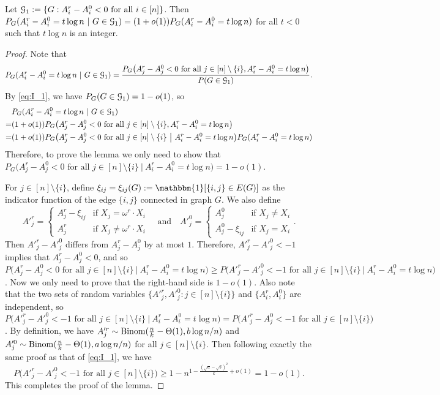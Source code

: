 \documentclass{article}
\begin{document}
\begin{lemma}  \label{lm:5t}
Let $\mathcal{G}_1:=\{G:A^r_i-A^0_i<0\text{~for all~}i\in[n]\}$.
Then $P_G(A^r_i-A^0_i= t\log n~|~G\in\mathcal{G}_1)= (1+o(1))P_G(A^r_i-A^0_i= t\log n)$ for all $t<0$ such that $t\log n$ is an integer.
\end{lemma}

\begin{proof}
Note that 
$$
P_G(A^r_i-A^0_i= t\log n~|~G\in\mathcal{G}_1)
=\frac{P_G \big(A^r_j-A^0_j<0\text{~for all~} j\in[n]\setminus\{i\}, A^r_i-A^0_i= t\log n \big)}{P(G\in\mathcal{G}_1)} .
$$
By \eqref{eq:I_1}, we have $P_G(G\in\mathcal{G}_1)=1-o(1)$, so
\begin{align*}
& P_G(A^r_i-A^0_i= t\log n~|~G\in\mathcal{G}_1) \\
= & (1+o(1)) P_G \big(A^r_j-A^0_j<0\text{~for all~} j\in[n]\setminus\{i\}, A^r_i-A^0_i= t\log n \big) \\
= & (1+o(1)) P_G \big(A^r_j-A^0_j<0\text{~for all~} j\in[n]\setminus\{i\} ~\big|~ A^r_i-A^0_i= t\log n \big) P_G(A^r_i-A^0_i= t\log n)
\end{align*}
Therefore, to prove the lemma we only need to show that $P_G \big(A^r_j-A^0_j<0\text{~for all~} j\in[n]\setminus\{i\} ~\big|~ A^r_i-A^0_i= t\log n \big)=1-o(1)$. 

For $j\in[n]\setminus\{i\}$, define $\xi_{ij}=\xi_{ij}(G):=\mathbbm{1}[\{i,j\}\in E(G)]$ as the indicator function of the edge $\{i,j\}$ connected in graph $G$. We also define 
$$
A'^r_j=\left\{
\begin{array}{cl}
  A^r_j-\xi_{ij}   & \mbox{if~} X_j = \omega^r \cdot X_i \\
  A^r_j   &   \mbox{if~} X_j \neq \omega^r \cdot X_i
\end{array}
\right.
\quad \text{and} \quad
A'^0_j=\left\{
\begin{array}{cl}
  A^0_j   & \mbox{if~} X_j \neq X_i \\
  A^0_j-\xi_{ij}   &   \mbox{if~} X_j = X_i
\end{array}
\right. .
$$
Then $A'^r_j-A'^0_j$ differs from $A^r_j-A^0_j$ by at most $1$.
Therefore, $A'^r_j-A'^0_j<-1$ implies that $A^r_j-A^0_j<0$,
and so $P \big(A^r_j-A^0_j<0\text{~for all~} j\in[n]\setminus\{i\} ~\big|~ A^r_i-A^0_i= t\log n \big) \ge P \big(A'^r_j-A'^0_j<-1 \text{~for all~} j\in[n]\setminus\{i\} ~\big|~ A^r_i-A^0_i= t\log n \big)$.
Now we only need to prove that the right-hand side is $1-o(1)$.
Also note that the two sets of random variables $\{A'^r_j,A'^0_j:j\in[n]\setminus\{i\}\}$ and $\{A^r_i,A^0_i\}$ are independent,
so $P \big(A'^r_j-A'^0_j<-1 \text{~for all~} j\in[n]\setminus\{i\} ~\big|~ A^r_i-A^0_i= t\log n \big)=P \big(A'^r_j-A^0_j<-1 \text{~for all~} j\in[n]\setminus\{i\}  \big)$.
By definition, we have
$A'^r_j\sim\operatorname{Binom}(\frac{n}{k}-\Theta(1),b\log n/n)$
and $A'^0_j\sim\operatorname{Binom}(\frac{n}{k}-\Theta(1),a\log n/n)$ for all $j\in[n]\setminus\{i\}$.
Then following exactly the same proof as that of \eqref{eq:I_1}, we have
$$
P \big(A'^r_j-A'^0_j <-1 \text{~for all~} j\in[n]\setminus\{i\}  \big)
\ge 1- n^{1-\frac{(\sqrt{a}-\sqrt{b})^2}{k} +o(1)} = 1-o(1).
$$
This completes the proof of the lemma.
\end{proof}
\end{document}
